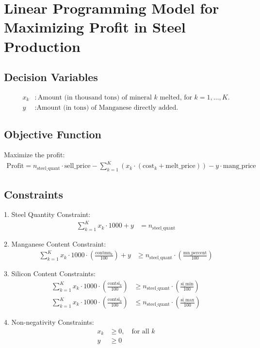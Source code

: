 \documentclass{article}
\begin{document}
\section*{Linear Programming Model for Maximizing Profit in Steel Production}

\subsection*{Decision Variables}
\begin{align*}
x_k & : \text{Amount (in thousand tons) of mineral } k \text{ melted, for } k = 1, \ldots, K. \\
y & : \text{Amount (in tons) of Manganese directly added.}
\end{align*}

\subsection*{Objective Function}
Maximize the profit:
\begin{align*}
\text{Profit} = n_{\text{steel\_quant}} \cdot \text{sell\_price} - \sum_{k=1}^{K} (x_k \cdot (\text{cost}_k + \text{melt\_price})) - y \cdot \text{mang\_price}
\end{align*}

\subsection*{Constraints}
1. Steel Quantity Constraint:
\begin{align*}
\sum_{k=1}^{K} x_k \cdot 1000 + y &= n_{\text{steel\_quant}}
\end{align*}

2. Manganese Content Constraint:
\begin{align*}
\sum_{k=1}^{K} x_k \cdot 1000 \cdot \left(\frac{\text{contmn}_k}{100}\right) + y &\geq n_{\text{steel\_quant}} \cdot \left(\frac{\text{mn\_percent}}{100}\right)
\end{align*}

3. Silicon Content Constraints:
\begin{align*}
\sum_{k=1}^{K} x_k \cdot 1000 \cdot \left(\frac{\text{contsi}_k}{100}\right) &\geq n_{\text{steel\_quant}} \cdot \left(\frac{\text{si\_min}}{100}\right) \\
\sum_{k=1}^{K} x_k \cdot 1000 \cdot \left(\frac{\text{contsi}_k}{100}\right) &\leq n_{\text{steel\_quant}} \cdot \left(\frac{\text{si\_max}}{100}\right)
\end{align*}

4. Non-negativity Constraints:
\begin{align*}
x_k &\geq 0, \quad \text{for all } k \\
y &\geq 0
\end{align*}
\end{document}
